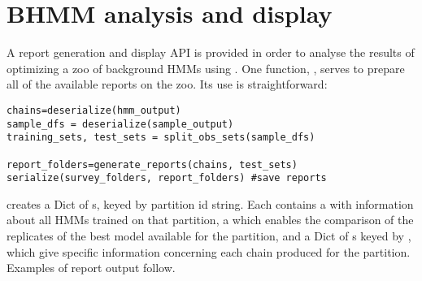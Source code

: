 \section{BHMM analysis and display}
\label{sec:BBMdisplay}
A report generation and display API is provided in order to analyse the results of optimizing a zoo of background HMMs using . One function, , serves to prepare all of the available reports on the zoo. Its use is straightforward:

\begin{verbatim}
chains=deserialize(hmm_output)
sample_dfs = deserialize(sample_output)
training_sets, test_sets = split_obs_sets(sample_dfs)

report_folders=generate_reports(chains, test_sets)
serialize(survey_folders, report_folders) #save reports
\end{verbatim}

 creates a Dict of s, keyed by partition id string. Each  contains a  with information about all HMMs trained on that partition, a  which enables the comparison of the replicates of the best model available for the partition, and a Dict of s keyed by , which give specific information concerning each chain produced for the partition. Examples of report output follow.

